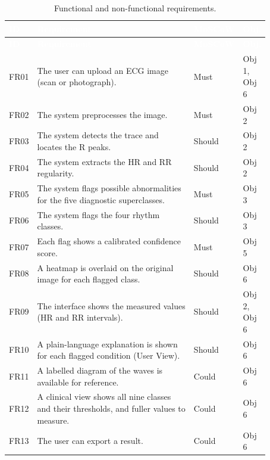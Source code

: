 \documentclass[12pt,nonacm,acmlarge,titlepage,screen]{acmart}
\begin{document}
\begingroup
\footnotesize
\setlength{\arrayrulewidth}{0.8pt}
\renewcommand{\arraystretch}{1.0}
\begin{longtable}{|P{0.08\linewidth}|P{0.60\linewidth}|P{0.105\linewidth}|P{0.085\linewidth}|}
  \caption{Functional and non-functional requirements.}
  \label{tab:functional-req} \\
    \hline
    \textcolor{white}{\textbf{ID}} & \textcolor{white}{\textbf{Requirement}} &
    \textcolor{white}{\textbf{MoSCoW}} & \textcolor{white}{\textbf{Obj.}} \\
    \hline
  \endfirsthead
    \hline
    \textcolor{white}{\textbf{ID}} & \textcolor{white}{\textbf{Requirement}} &
    \textcolor{white}{\textbf{MoSCoW}} & \textcolor{white}{\textbf{Obj.}} \\
    \hline
  \endhead
    FR01 & The user can upload an ECG image (scan or photograph). & Must & Obj 1, Obj 6 \\
    \hline
    FR02 & The system preprocesses the image. & Must & Obj 2 \\
    \hline
    FR03 & The system detects the trace and locates the R peaks. & Should & Obj 2 \\
    \hline
    FR04 & The system extracts the HR and RR regularity. & Should & Obj 2 \\
    \hline
    FR05 & The system flags possible abnormalities for the five diagnostic superclasses. & Must & Obj 3 \\
    \hline
    FR06 & The system flags the four rhythm classes. & Should & Obj 3 \\
    \hline
    FR07 & Each flag shows a calibrated confidence score. & Must & Obj 5 \\
    \hline
    FR08 & A heatmap is overlaid on the original image for each flagged class. & Should & Obj 6 \\
    \hline
    FR09 & The interface shows the measured values (HR and RR intervals). & Should & Obj 2, Obj 6 \\
    \hline
    FR10 & A plain-language explanation is shown for each flagged condition (User View). & Should & Obj 6 \\
    \hline
    FR11 & A labelled diagram of the waves is available for reference. & Could & Obj 6 \\
    \hline
    FR12 & A clinical view shows all nine classes and their thresholds, and fuller values to measure. & Could & Obj 6 \\
    \hline
    FR13 & The user can export a result. & Could & Obj 6 \\

\end{longtable}
\end{document}
